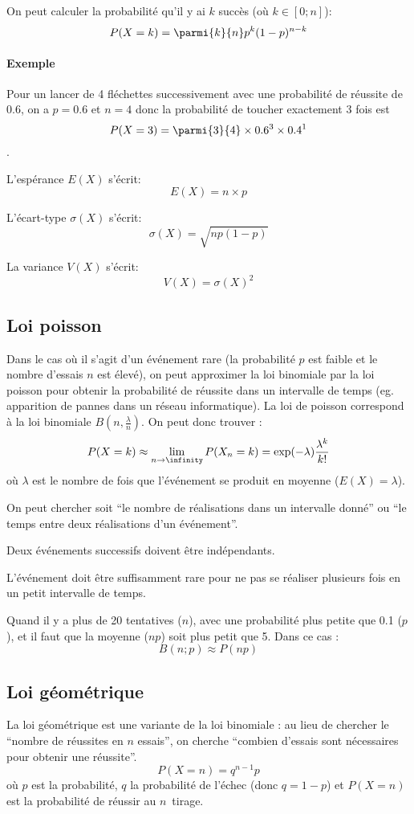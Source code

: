\documentclass[10pt,a4paper,french]{article}
\begin{document}
On peut calculer la probabilité qu'il y ai $k$ succès (où $k \in [0; n]$):
\[
P(X=k) = \parmi{k}{n} p^k (1-p)^{n-k}
\]

\paragraph{Exemple}
Pour un lancer de 4 fléchettes successivement avec une probabilité de réussite de $0.6$, on a $p=0.6$ et $n=4$ donc la probabilité de toucher exactement 3 fois est \[ P(X=3) = \parmi{3}{4} \times 0.6^3 \times 0.4^1 \].

L'espérance $E(X)$ s'écrit: \[E(X)=n \times p\]

L'écart-type $\sigma(X)$ s'écrit: \[\sigma(X)=\sqrt{np(1-p)}\]

La variance $V(X)$ s'écrit: \[V(X) = \sigma(X)^2\]

\subsection{Loi poisson}
Dans le cas où il s'agit d'un événement rare (la probabilité $p$ est faible et le nombre d'essais $n$ est élevé), on peut approximer la loi binomiale par la loi poisson pour obtenir la probabilité de réussite dans un intervalle de temps (eg. apparition de pannes dans un réseau informatique). La loi de poisson correspond à la loi binomiale $B(n, \frac{\lambda}{n})$. On peut donc trouver :
\[
P(X = k) \approx \lim_{n \to \infinity} P(X_n = k) = \exp(-\lambda) \frac{\lambda^k}{k!}
\] où $\lambda$ est le nombre de fois que l'événement se produit en moyenne ($E(X) = \lambda$).

On peut chercher soit ``le nombre de réalisations dans un intervalle donné'' ou ``le temps entre deux réalisations d'un événement''.

Deux événements successifs doivent être indépendants.

L'événement doit être suffisamment rare pour ne pas se réaliser plusieurs fois en un petit intervalle de temps.

Quand il y a plus de 20 tentatives ($n$), avec une probabilité plus petite que 0.1 ($p$), et il faut que la moyenne ($np$) soit plus petit que 5. Dans ce cas : \[B(n; p) \approx P(np)\]

\subsection{Loi géométrique}

La loi géométrique est une variante de la loi binomiale : au lieu de chercher le ``nombre de réussites en $n$ essais'', on cherche ``combien d'essais sont nécessaires pour obtenir une réussite''.
\[
P(X = n) = q^{n-1} p
\] où $p$ est la probabilité, $q$ la probabilité de l'échec (donc $q = 1-p$) et $P(X = n)$ est la probabilité de réussir au $n$\ieme~tirage.
\end{document}
